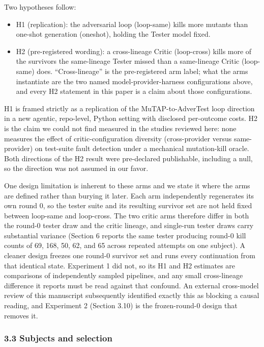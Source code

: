 \documentclass[
  11pt,
]{article}
\newcounter{none} %
\providecommand{\tightlist}{%
  \setlength{\itemsep}{0pt}\setlength{\parskip}{0pt}}
\begin{document}
Two hypotheses follow:

\begin{itemize}
\tightlist
\item
  H1 (replication): the adversarial loop (loop-same) kills more mutants
  than one-shot generation (oneshot), holding the Tester model fixed.
\item
  H2 (pre-registered wording): a cross-lineage Critic (loop-cross) kills
  more of the survivors the same-lineage Tester missed than a
  same-lineage Critic (loop-same) does. ``Cross-lineage'' is the
  pre-registered arm label; what the arms instantiate are the two named
  model-provider-harness configurations above, and every H2 statement in
  this paper is a claim about those configurations.
\end{itemize}

H1 is framed strictly as a replication of the MuTAP-to-AdverTest loop
direction in a new agentic, repo-level, Python setting with disclosed
per-outcome costs. H2 is the claim we could not find measured in the
studies reviewed here: none measures the effect of critic-configuration
diversity (cross-provider versus same-provider) on test-suite fault
detection under a mechanical mutation-kill oracle. Both directions of
the H2 result were pre-declared publishable, including a null, so the
direction was not assumed in our favor.

One design limitation is inherent to these arms and we state it where
the arms are defined rather than burying it later. Each arm
independently regenerates its own round 0, so the tester suite and its
resulting survivor set are not held fixed between loop-same and
loop-cross. The two critic arms therefore differ in both the round-0
tester draw and the critic lineage, and single-run tester draws carry
substantial variance (Section 6 reports the same tester producing
round-0 kill counts of 69, 168, 50, 62, and 65 across repeated attempts
on one subject). A cleaner design freezes one round-0 survivor set and
runs every continuation from that identical state. Experiment 1 did not,
so its H1 and H2 estimates are comparisons of independently sampled
pipelines, and any small cross-lineage difference it reports must be
read against that confound. An external cross-model review of this
manuscript subsequently identified exactly this as blocking a causal
reading, and Experiment 2 (Section 3.10) is the frozen-round-0 design
that removes it.

\subsubsection{3.3 Subjects and selection}\label{subjects-and-selection}
\end{document}
